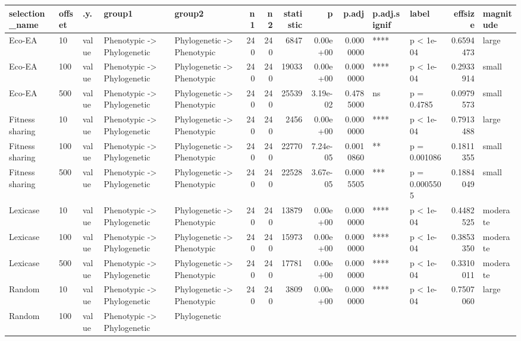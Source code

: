 \documentclass[]{book}
\begin{document}
\begin{table}
\centering
\begin{tabular}[t]{l|l|l|l|l|r|r|r|r|r|l|l|r|l}
\hline
selection\_name & offset & .y. & group1 & group2 & n1 & n2 & statistic & p & p.adj & p.adj.signif & label & effsize & magnitude\\
\hline
Eco-EA & 10 & value & Phenotypic
    ->
Phylogenetic & Phylogenetic
    ->
Phenotypic & 240 & 240 & 6847 & 0.00e+00 & 0.0000000 & **** & p < 1e-04 & 0.6594473 & large\\
\hline
Eco-EA & 100 & value & Phenotypic
    ->
Phylogenetic & Phylogenetic
    ->
Phenotypic & 240 & 240 & 19033 & 0.00e+00 & 0.0000000 & **** & p < 1e-04 & 0.2933914 & small\\
\hline
Eco-EA & 500 & value & Phenotypic
    ->
Phylogenetic & Phylogenetic
    ->
Phenotypic & 240 & 240 & 25539 & 3.19e-02 & 0.4785000 & ns & p = 0.4785 & 0.0979573 & small\\
\hline
Fitness sharing & 10 & value & Phenotypic
    ->
Phylogenetic & Phylogenetic
    ->
Phenotypic & 240 & 240 & 2456 & 0.00e+00 & 0.0000000 & **** & p < 1e-04 & 0.7913488 & large\\
\hline
Fitness sharing & 100 & value & Phenotypic
    ->
Phylogenetic & Phylogenetic
    ->
Phenotypic & 240 & 240 & 22770 & 7.24e-05 & 0.0010860 & ** & p = 0.001086 & 0.1811355 & small\\
\hline
Fitness sharing & 500 & value & Phenotypic
    ->
Phylogenetic & Phylogenetic
    ->
Phenotypic & 240 & 240 & 22528 & 3.67e-05 & 0.0005505 & *** & p = 0.0005505 & 0.1884049 & small\\
\hline
Lexicase & 10 & value & Phenotypic
    ->
Phylogenetic & Phylogenetic
    ->
Phenotypic & 240 & 240 & 13879 & 0.00e+00 & 0.0000000 & **** & p < 1e-04 & 0.4482525 & moderate\\
\hline
Lexicase & 100 & value & Phenotypic
    ->
Phylogenetic & Phylogenetic
    ->
Phenotypic & 240 & 240 & 15973 & 0.00e+00 & 0.0000000 & **** & p < 1e-04 & 0.3853350 & moderate\\
\hline
Lexicase & 500 & value & Phenotypic
    ->
Phylogenetic & Phylogenetic
    ->
Phenotypic & 240 & 240 & 17781 & 0.00e+00 & 0.0000000 & **** & p < 1e-04 & 0.3310011 & moderate\\
\hline
Random & 10 & value & Phenotypic
    ->
Phylogenetic & Phylogenetic
    ->
Phenotypic & 240 & 240 & 3809 & 0.00e+00 & 0.0000000 & **** & p < 1e-04 & 0.7507060 & large\\
\hline
Random & 100 & value & Phenotypic
    ->
Phylogenetic & Phylogenetic

\end{tabular}
\end{table}
\end{document}
